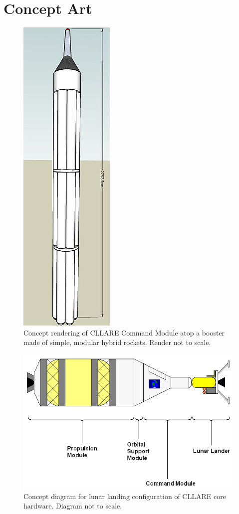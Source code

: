 \documentclass{report}
\begin{document}
\chapter{Concept Art}

\begin{figure}[h] \label{fig:cm_on_modular_booster}
\centering
\includegraphics[scale=0.6]{images/cm_on_modular_booster}
\caption{Concept rendering of CLLARE Command Module atop a booster made of simple, modular hybrid rockets.  Render not to scale.}
\end{figure}

\begin{figure}[h] \label{fig:cllare_lunar_landing_config}
\centering
\includegraphics[scale=0.6]{images/cllare_lunar_landing_config}
\caption{Concept diagram for lunar landing configuration of CLLARE core hardware.  Diagram not to scale.}

\end{figure}
\end{document}
